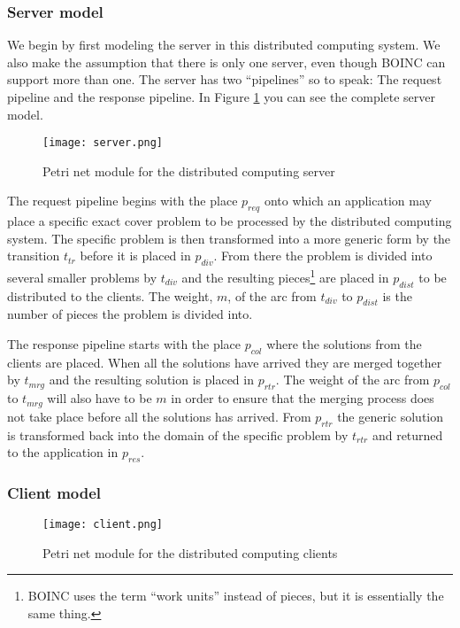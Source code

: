 \subsubsection{Server model}

We begin by first modeling the server in this distributed computing system.
We also make the assumption that there is only one server, even though BOINC can support more than one.
The server has two ``pipelines'' so to speak: The request pipeline and the response pipeline.
In Figure \ref{fig:server} you can see the complete server model.

\begin{figure}[htbp]
	\centering 
	\texttt{[image: server.png]}
	\caption{Petri net module for the distributed computing server}
	\label{fig:server}
\end{figure}

The request pipeline begins with the place $p_{req}$ onto which an application may place a specific exact cover problem to be processed by the distributed computing system.
The specific problem is then transformed into a more generic form by the transition $t_{tr}$ before it is placed in $p_{div}$.
From there the problem is divided into several smaller problems by $t_{div}$ and the resulting pieces\footnote{BOINC uses the term ``work units'' instead of pieces, but it is essentially the same thing.} are placed in $p_{dist}$ to be distributed to the clients.
The weight, $m$, of the arc from $t_{div}$ to $p_{dist}$ is the number of pieces the problem is divided into.

The response pipeline starts with the place $p_{col}$ where the solutions from the clients are placed.
When all the solutions have arrived they are merged together by $t_{mrg}$ and the resulting solution is placed in $p_{rtr}$.
The weight of the arc from $p_{col}$ to $t_{mrg}$ will also have to be $m$ in order to ensure that the merging process does not take place before all the solutions has arrived.
From $p_{rtr}$ the generic solution is transformed back into the domain of the specific problem by $t_{rtr}$ and returned to the application in $p_{res}$.


\subsubsection{Client model}

\begin{figure}[htbp]
	\centering 
	\texttt{[image: client.png]}
	\caption{Petri net module for the distributed computing clients}
	\label{fig:client}
\end{figure}

